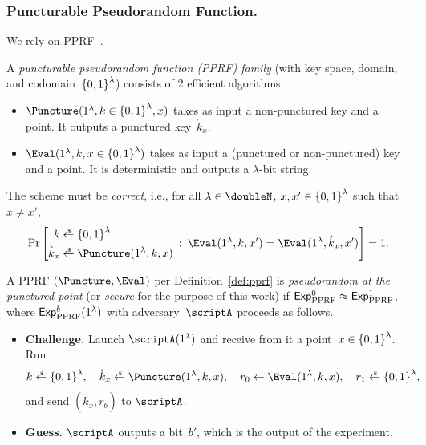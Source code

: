 \subsubsection{Puncturable Pseudorandom Function.}
We rely on PPRF~\cite{AC:BonWat13,CCS:KPTZ13,PKC:BoyGolIva14,STOC:SahWat14}.

\begin{definition}\label{def:pprf}
A \emph{puncturable pseudorandom function (PPRF) family} (with key space, domain, and codomain~${\{0,1\}}^\lambda$) consists of 2 efficient algorithms.
\begin{itemize}
\item ${\Puncture(1^\lambda,k\in\bit^\lambda,x)}$
takes as input a non-punctured key and a point.
It out\-puts a punctured key~$\mathring{k}_x$.
\item ${\Eval(1^\lambda,k,x\in\bit^\lambda)}$
takes as input a (punctured or non-punctured) key and a point.
It is deterministic and outputs a $\lambda$-bit string.
\end{itemize}
The scheme must be \emph{correct}, i.e., for all
${\lambda\in\doubleN}$,
${x,x'\in{\{0,1\}}^\lambda}$ such that ${x\neq x'}$,
\begin{align*}
\Pr\left[
\begin{aligned}
k&{}\draws\bit^\lambda\\
\mathring{k}_x&{}\draws\Puncture(1^\lambda,k,x)
\end{aligned}
\::\:
\Eval(1^\lambda,k,x')
=
\Eval(1^\lambda,\mathring{k}_x,x')
\right]=1.
\end{align*}
\end{definition}

\begin{definition}\label{def:pprf-security}
A PPRF $(\Puncture,\Eval)$ per Definition~\ref{def:pprf} is \emph{pseudorandom at the punctured point} (or \emph{secure} for the purpose of this work)
if ${\ExpPPRF{0}\approx\ExpPPRF{1}}$,
where $\ExpPPRF{b}(1^\lambda)$ with adversary~$\scriptA$ proceeds as follows.
\begin{itemize}\upshape
\item\textbf{Challenge.}
Launch $\scriptA(1^\lambda)$ and receive from it a point~${x\in{\{0,1\}}^\lambda}$.
Run
\begin{align*}
\WideNarrow{}{\hspace*{-1.2em}}
k\draws\bit^\lambda,\quad
\mathring{k}_x\draws\Puncture(1^\lambda,k,x),\quad
r_0\gets\Eval(1^\lambda,k,x),\quad
r_1\draws\bit^\lambda,
\end{align*}
and send $(\mathring{k}_x,r_b)$ to $\scriptA$.
\item\textbf{Guess.}
$\scriptA$ outputs a bit~$b'$, which is the output of the experiment.
\end{itemize}
\end{definition}
